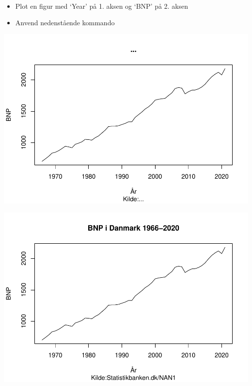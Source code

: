 \documentclass[
  12pt,
]{article}
\newenvironment{Shaded}{\begin{snugshade}}{\end{snugshade}}
\newcommand{\AttributeTok}[1]{\textcolor[rgb]{0.77,0.63,0.00}{#1}}
\newcommand{\DecValTok}[1]{\textcolor[rgb]{0.00,0.00,0.81}{#1}}
\newcommand{\FunctionTok}[1]{\textcolor[rgb]{0.00,0.00,0.00}{#1}}
\newcommand{\NormalTok}[1]{#1}
\newcommand{\SpecialCharTok}[1]{\textcolor[rgb]{0.00,0.00,0.00}{#1}}
\newcommand{\StringTok}[1]{\textcolor[rgb]{0.31,0.60,0.02}{#1}}
\providecommand{\tightlist}{%
  \setlength{\itemsep}{0pt}\setlength{\parskip}{0pt}}
\begin{document}
\begin{itemize}
\tightlist
\item
  Plot en figur med `Year' på 1. aksen og `BNP' på 2. aksen
\item
  Anvend nedenstående kommando
\end{itemize}

\begin{Shaded}
\end{Shaded}

\includegraphics{Rkursus_done_files/figure-latex/unnamed-chunk-3-1.pdf}

\includegraphics{Rkursus_done_files/figure-latex/unnamed-chunk-4-1.pdf}
\end{document}
